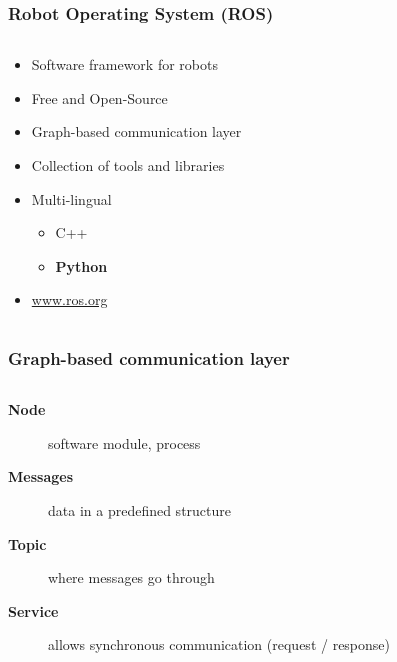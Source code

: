 \documentclass[aspectratio=169]{beamer}
\begin{document}
  \begin{frame}
   \frametitle{Robot Operating System (ROS)}
   \begin{columns}[onlytextwidth]
    \begin{column}{0.5\textwidth}
    
      \begin{itemize}
       \item Software framework for robots \pause
       \item Free and Open-Source \pause
       \item Graph-based communication layer \pause
       \item Collection of tools and libraries \pause
       \item Multi-lingual 
       \begin{itemize}
	\item C++
	\item \textbf{Python} \pause
       \end{itemize}
       \item \url{www.ros.org}
      \end{itemize}
    
    \end{column}
    \begin{column}{0.5\textwidth}
    
    
    \end{column}
   \end{columns}
  \end{frame}

  \begin{frame}
   \frametitle{Graph-based communication layer}
   \begin{columns}[onlytextwidth]
    \begin{column}{0.5\textwidth}
    
      \begin{description}
       \item [\textbf{Node}] software module, process
       \item [\textbf{Messages}] data in a predefined structure
       \item [\textbf{Topic}] where messages go through \pause
       \item [\textbf{Service}] allows synchronous communication (request / response)
      \end{description}
       
    \end{column}
    \begin{column}{0.5\textwidth}

    \end{column}
   \end{columns}
  \end{frame}
\end{document}

